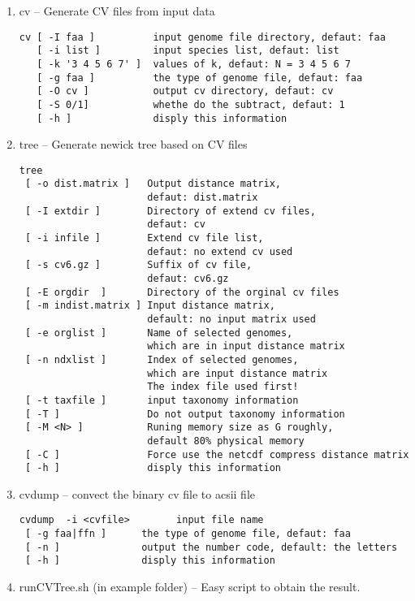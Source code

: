 \documentclass[a4paper,12pt]{article}
\begin{document}
\begin{enumerate}\itemsep 0pt
  \item cv -- Generate CV files from input data
\begin{verbatim}
cv [ -I faa ]          input genome file directory, defaut: faa
   [ -i list ]         input species list, defaut: list
   [ -k '3 4 5 6 7' ]  values of k, defaut: N = 3 4 5 6 7
   [ -g faa ]          the type of genome file, defaut: faa
   [ -O cv ]           output cv directory, defaut: cv
   [ -S 0/1]           whethe do the subtract, defaut: 1
   [ -h ]              disply this information
\end{verbatim}

  \item tree -- Generate newick tree based on CV files
\begin{verbatim}
tree
 [ -o dist.matrix ]   Output distance matrix, 
                      defaut: dist.matrix
 [ -I extdir ]        Directory of extend cv files, 
                      defaut: cv
 [ -i infile ]        Extend cv file list, 
                      defaut: no extend cv used
 [ -s cv6.gz ]        Suffix of cv file, 
                      defaut: cv6.gz
 [ -E orgdir  ]       Directory of the orginal cv files
 [ -m indist.matrix ] Input distance matrix, 
                      default: no input matrix used
 [ -e orglist ]       Name of selected genomes, 
                      which are in input distance matrix
 [ -n ndxlist ]       Index of selected genomes, 
                      which are input distance matrix
                      The index file used first!
 [ -t taxfile ]       input taxonomy information
 [ -T ]               Do not output taxonomy information
 [ -M <N> ]           Runing memory size as G roughly, 
                      default 80% physical memory
 [ -C ]               Force use the netcdf compress distance matrix
 [ -h ]               disply this information
\end{verbatim}
\item cvdump -- convect the binary cv file to acsii file
\begin{verbatim}
cvdump  -i <cvfile>        input file name
 [ -g faa|ffn ]      the type of genome file, defaut: faa
 [ -n ]              output the number code, default: the letters
 [ -h ]              disply this information
\end{verbatim}

  \item runCVTree.sh (in example folder) -- Easy script to obtain the result.
\end{enumerate}
\end{document}
